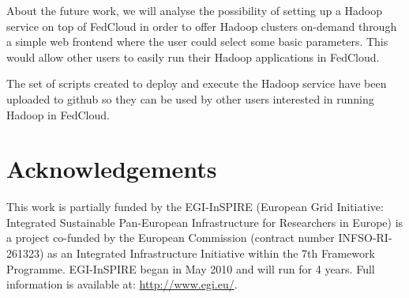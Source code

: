\documentclass[oribibl]{llncs_Ibergrid2013}
\begin{document}
About the future work, we will analyse the possibility of setting up a Hadoop service on top of FedCloud in order to offer Hadoop clusters on-demand through a simple web frontend where the user could select some basic parameters. This would allow other users to easily run their Hadoop applications in FedCloud.

The set of scripts created to deploy and execute the Hadoop service have been uploaded to github\cite{scripts} so they can be used by other users interested in running Hadoop in FedCloud.


\section*{Acknowledgements}
\label{sect-acknowledgements}
This work is partially funded by the  EGI-InSPIRE (European Grid Initiative: Integrated Sustainable
Pan-European Infrastructure for Researchers in Europe) is a project co-funded by the European Commission 
(contract number INFSO-RI-261323) as an Integrated Infrastructure Initiative within the 7th Framework 
Programme. EGI-InSPIRE began in May 2010 and will run for 4 years. Full information is available at:
\url{http://www.egi.eu/}.

%
%
%


\end{document}
